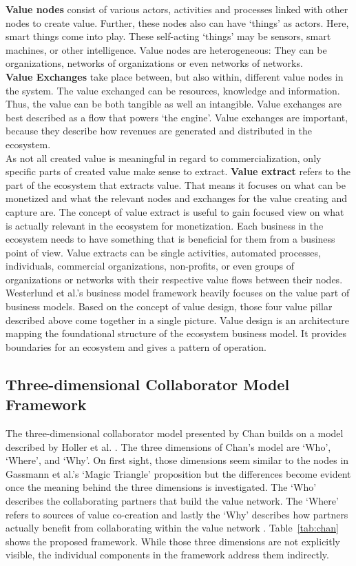 		\textbf{Value nodes} consist of various actors, activities and processes linked with other nodes to create value. Further, these nodes also can have `things' as actors. Here, smart things come into play. These self-acting `things' may be sensors, smart machines, or other intelligence. Value nodes are heterogeneous: They can be organizations, networks of organizations or even networks of networks.\\
		\textbf{Value Exchanges} take place between, but also within, different value nodes in the system. The value exchanged can be resources, knowledge and information. Thus, the value can be both tangible as well an intangible. Value exchanges are best described as a flow that powers `the engine'. Value exchanges are important, because they describe how revenues are generated and distributed in the ecosystem.\\
		As not all created value is meaningful in regard to commercialization, only specific parts of created value make sense to extract. \textbf{Value extract} refers to the part of the ecosystem that extracts value. That means it focuses on what can be monetized and what the relevant nodes and exchanges for the value creating and capture are. The concept of value extract is useful to gain focused view on what is actually relevant in the ecosystem for monetization. Each business in the ecosystem needs to have something that is beneficial for them from a business point of view. Value extracts can be single activities, automated processes, individuals, commercial organizations, non-profits, or even groups of organizations or networks with their respective value flows between their nodes.\\
		Westerlund et al.'s business model framework heavily focuses on the value part of business models. Based on the concept of value design, those four value pillar described above come together in a single picture. Value design is an architecture mapping the foundational structure of the ecosystem business model. It provides boundaries for an ecosystem and gives a pattern of operation.
	\vspace{-2em}
	\subsection{Three-dimensional Collaborator Model Framework}
	\vspace{-1em}	
		The three-dimensional collaborator model presented by Chan \cite{chan} builds on a model described by Holler et al. \cite{holler}. The three dimensions of Chan's model are `Who', `Where', and `Why'. On first sight, those dimensions seem similar to the nodes in Gassmann et al.'s `Magic Triangle' proposition but the differences become evident once the meaning behind the three dimensions is investigated. The `Who' describes the collaborating partners that build the value network. The `Where' refers to sources of value co-creation and lastly the `Why' describes how partners actually benefit from collaborating within the value network \cite{chan}. Table~\ref{tab:chan} shows the proposed framework. While those three dimensions are not explicitly visible, the individual components in the framework address them indirectly.

